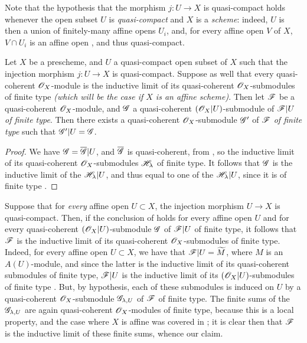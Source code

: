 Note that the hypothesis that the morphism $j:U\to X$ is quasi-compact
holds whenever the open subset $U$ is \emph{quasi-compact} and $X$ is a
\emph{scheme}: indeed, $U$ is then a union of finitely-many affine opens $U_i$,
and, for every affine open $V$ of $X$, $V\cap U_i$ is an affine open , and
thus quasi-compact.

\begin{corollary}[9.4.3]
\label{1.9.4.3}
Let $X$ be a prescheme, and $U$ a quasi-compact open subset of $X$ such that the injection
morphism $j:U\to X$ is quasi-compact. Suppose as well that every quasi-coherent
$\mathscr{O}_X$-module is the inductive limit of its quasi-coherent $\mathscr{O}_X$-submodules of finite type
\emph{(which will be the case if $X$ is an \emph{affine scheme})}. Then let $\mathscr{F}$ be a
quasi-coherent $\mathscr{O}_X$-module, and $\mathscr{G}$ a quasi-coherent $(\mathscr{O}_X|U)$-submodule of $\mathscr{F}|U$ \emph{of finite type}. Then there exists a quasi-coherent $\mathscr{O}_X$-submodule $\mathscr{G}'$ of
$\mathscr{F}$ \emph{of finite type} such that $\mathscr{G}'|U=\mathscr{G}$.
\end{corollary}

\begin{proof}
\label{proof-1.9.4.3}
We have $\mathscr{G}=\overline{\mathscr{G}}|U$, and $\overline{\mathscr{G}}$ is quasi-coherent, from
, so the inductive limit of its quasi-coherent $\mathscr{O}_X$-submodules
$\mathscr{H}_\lambda$ of finite type. It follows that $\mathscr{G}$ is the inductive limit of the
$\mathscr{H}_\lambda|U$, and thus equal to one of the $\mathscr{H}_\lambda|U$, since it is of finite
type .
\end{proof}

\begin{remark}[9.4.4]
\label{1.9.4.4}
Suppose that for \emph{every} affine open $U\subset X$, the injection morphism $U\to X$ is
quasi-compact. Then, if the conclusion of  holds for every affine open $U$
and for every quasi-coherent $(\mathscr{O}_X|U)$-submodule $\mathscr{G}$ of $\mathscr{F}|U$ of finite type, it
follows
that $\mathscr{F}$ is the inductive limit of its quasi-coherent $\mathscr{O}_X$-submodules of finite type.
Indeed, for every affine open $U\subset X$, we have that $\mathscr{F}|U={\widetilde{M}}$, where $M$
is an $A(U)$-module, and since the latter is the inductive limit of its quasi-coherent
submodules of finite type, $\mathscr{F}|U$ is the inductive limit of its $(\mathscr{O}_X|U)$-submodules of
finite type . But, by hypothesis, each of these submodules is induced on $U$
by a quasi-coherent $\mathscr{O}_X$-submodule $\mathscr{G}_{\lambda,U}$ of $\mathscr{F}$ of finite type. The
finite sums of the $\mathscr{G}_{\lambda,U}$ are again quasi-coherent $\mathscr{O}_X$-modules of finite
type, because this is a local property, and the case where $X$ is affine was covered in
; it is clear then that $\mathscr{F}$ is the inductive limit of these finite
sums, whence our claim.
\end{remark}

